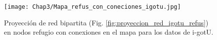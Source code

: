 \begin{figure}[ht]
    \begin{center}
        \texttt{[image: Chap3/Mapa\_refus\_con\_coneciones\_igotu.jpg]}
        \caption[Proyección en nodos refugio con conexiones en el mapa.]{Proyección de red bipartita (Fig. \ref{fig:proyeccion_red_igotu_refus}) en nodos refugio con conexiones en el mapa para los datos de i-gotU. }
        \label{fig:mapa_con_conexiones_igotu}
       
        \end{center}
\end{figure}
 
 
 
 
 
 

